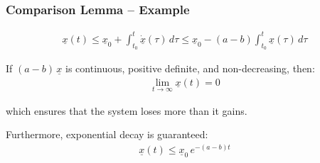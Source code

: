 \documentclass[student, noshadow, lsr, english, aspectratio=169, t]{ITR_LSR_slides}
\begin{document}
\begin{frame}
	\frametitle{Comparison Lemma – Example}

	\begin{align*}
		\underline{x}(t) \leq \underline{x}_0 + \int_{t_0}^{t} \dot{\underline{x}}(\tau)\, d\tau 
		\leq \underline{x}_0 - (a - b) \int_{t_0}^{t} \underline{x}(\tau)\, d\tau
	\end{align*}

	If $(a - b)\,\underline{x}$ is continuous, positive definite, and non-decreasing, then:
	\begin{align*}
		\lim_{t \to \infty} \underline{x}(t) = 0
	\end{align*}

	which ensures that the system loses more than it gains.

	\vspace{0.5em}
	Furthermore, exponential decay is guaranteed:
	\begin{align*}
		\underline{x}(t) \leq \underline{x}_0\, e^{-(a - b)t}
	\end{align*}
\end{frame}


\end{document}
